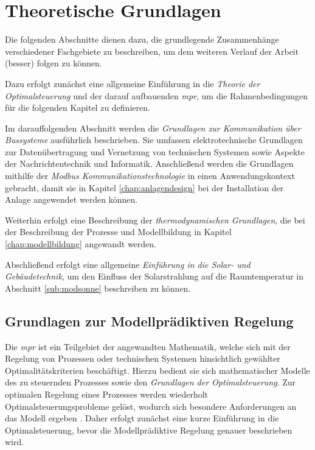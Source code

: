 \renewcommand{\chapterheadstartvskip}{\vspace*{2cm}}

\chapter{Theoretische Grundlagen}
\label{chap:theoretischegrundlagen}

Die folgenden Abschnitte dienen dazu, die grundlegende Zusammenhänge verschiedener Fachgebiete zu beschreiben, um dem weiteren Verlauf der Arbeit (besser) folgen zu können.

 Dazu erfolgt zunächst eine allgemeine Einführung in die \textit{Theorie der Optimalsteuerung} und der darauf aufbauenden \textit{\acrlong{mpr}}, um die Rahmenbedingungen für die folgenden Kapitel zu definieren. 
 
Im darauffolgenden Abschnitt werden die \textit{Grundlagen zur Kommunikation über Bussysteme} ausführlich beschrieben. Sie umfassen elektrotechnische Grundlagen zur Datenübertragung und Vernetzung von technischen Systemen sowie Aspekte der Nachrichtentechnik und Informatik. Anschließend werden die Grundlagen mithilfe der \textit{Modbus Kommunikationstechnologie} in einen Anwendungskontext gebracht, damit sie in Kapitel \ref{chap:anlagendesign} bei der Installation der Anlage angewendet werden können.

Weiterhin erfolgt eine Beschreibung der \textit{thermodynamischen Grundlagen}, die bei der Beschreibung der Prozesse und Modellbildung in Kapitel \ref{chap:modellbildung} angewandt werden. 

Abschließend erfolgt eine allgemeine \textit{Einführung in die Solar- und Gebäudetechnik}, um den Einfluss der Solarstrahlung auf die Raumtemperatur in Abschnitt \ref{sub:modsonne} beschreiben zu können.

\section{Grundlagen zur Modellprädiktiven Regelung}
\label{sec:mpc}

Die \textit{\acrlong{mpr}} ist ein Teilgebiet der angewandten Mathematik, welche sich mit der Regelung von Prozessen oder technischen Systemen hinsichtlich gewählter Optimalitätskriterien beschäftigt. Hierzu bedient sie sich mathematischer Modelle des zu steuernden Prozesses sowie den \textit{Grundlagen der Optimalsteuerung}. Zur optimalen Regelung eines Prozesses werden wiederholt Optimalsteuerungsprobleme gelöst, wodurch sich besondere Anforderungen an das Modell ergeben \cite[S.~10]{di14}. Daher erfolgt zunächst eine kurze Einführung in die Optimalsteuerung, bevor die Modellprädiktive Regelung genauer beschrieben wird.

